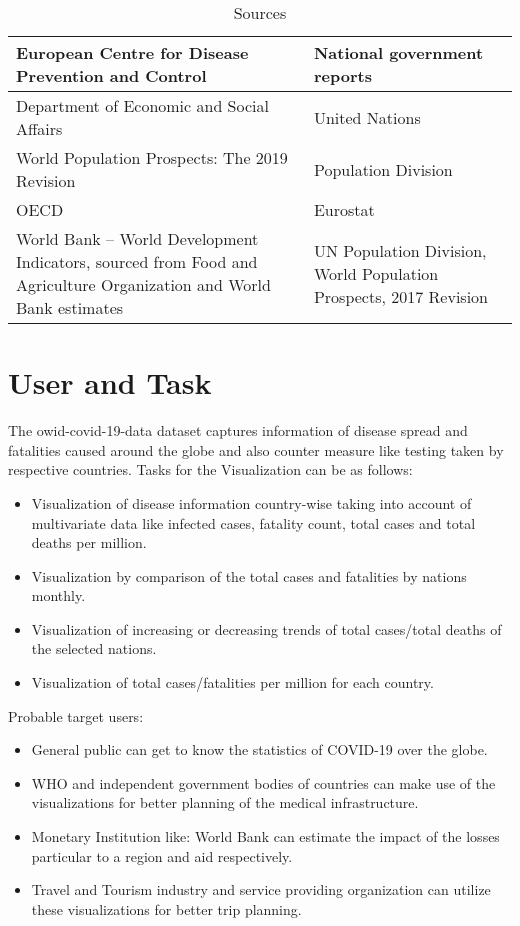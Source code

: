 \documentclass[10pt]{article}
\begin{document}
\begin{table}[htbp]
    \centering
    \begin{tabular}{|p{6cm}|p{6cm}|}
        \hline
        European Centre for Disease Prevention and Control &  National government reports \\
        \hline 
        Department of Economic and Social Affairs & United Nations \\
        \hline
        World Population Prospects: The 2019 Revision & Population Division \\
        \hline 
        OECD & Eurostat \\
        \hline
        World Bank – World Development Indicators, sourced from Food and Agriculture Organization and World Bank estimates &  UN Population Division, World Population Prospects, 2017 Revision\\
        \hline
    \end{tabular}
	\caption{Sources}
	\label{tab:data_sources}
\end{table}




\section{User and Task}
The owid-covid-19-data dataset captures information of disease spread and fatalities caused around the globe and also counter measure like testing taken by respective countries.\newline
Tasks for the Visualization can be as follows:
\begin{itemize}
    \item Visualization of disease information country-wise taking into account of multivariate data like infected cases, fatality count, total cases and total deaths per million.
    \item Visualization by comparison of the total cases and fatalities by nations monthly.
    \item Visualization of increasing or decreasing trends of total cases/total deaths of the selected nations.
    \item Visualization of total cases/fatalities per million for each country.
\end{itemize}
Probable target users:
\begin{itemize}
    \item General public can get to know the statistics of COVID-19 over the globe. 
    \item WHO and independent government bodies of countries can make use of the visualizations for better planning of the medical infrastructure. 
    \item Monetary Institution like: World Bank can estimate the impact of the losses particular to a region and aid respectively.
    \item Travel and Tourism industry and service providing organization can utilize these visualizations for better trip planning.
\end{itemize}
\end{document}
